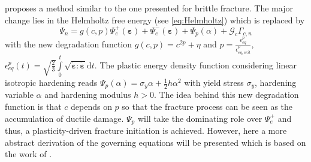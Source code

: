 \citet{06_PF_ductile} proposes a method similar to the one presented for brittle fracture. The major change lies in the Helmholtz free energy (see \eqref{eq:Helmholtz}) which is replaced by
\begin{equation} \label{eq:Helmholtz_ductile1}
	\Psi_{n} = g\left(c,p\right)\Psi_{e}^{+}\left(\bm{\varepsilon}\right)+\Psi_{e}^{-}\left(\bm{\varepsilon}\right)+\Psi_{p}\left(\alpha\right)+\mathcal{G}_{c}\Gamma_{c,n}
\end{equation}
with the new degradation function $g\left(c,p\right)=c^{2p}+\eta$ and $p=\frac{\epsilon_{eq}^{p}}{\epsilon_{eq,crit}^{p}}$, $\epsilon_{eq}^{p}\left(t\right)=\sqrt{\frac{2}{3}}\int\limits_{0}^{t}\sqrt{\dot{\bm{\varepsilon}}:\dot{\bm{\varepsilon}}}\mathrm{d}t$. The plastic energy density function considering linear isotropic hardening reads $\Psi_{p}\left(\alpha\right)=\sigma_{y}\alpha+\frac{1}{2}h\alpha^{2}$ with yield stress $\sigma_{y}$, hardening variable $\alpha$ and hardening modulus $h>0$. The idea behind this new degradation function is that $c$ depends on $p$ so that the fracture process can be seen as the accumulation of ductile damage. $\Psi_{p}$ will take the dominating role over $\Psi_{e}^{+}$ and thus, a plasticity-driven fracture initiation is achieved. However, here a more abstract derivation of the governing equations will be presented which is based on the work of \citet{03_PF_ductile}.

